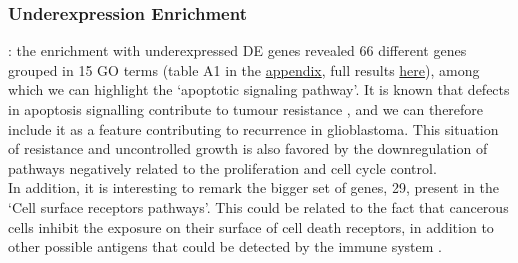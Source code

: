 \documentclass[9pt,twocolumn,twoside]{gsajnl}
\begin{document}
\subsubsection*{Underexpression Enrichment}: the enrichment with underexpressed DE genes revealed 66 different genes grouped in 15 GO terms (table A1 in the \href{http://ieoproject.tk/ieo/supplementary/appendix.pdf}{appendix}, full results \href{http://ieoproject.tk/ieo/supplementary/go_underexpr_results.html}{here}), among which we can highlight the `apoptotic signaling pathway'. It is known that defects in apoptosis signalling contribute to tumour resistance \citep{Debatin2004}, and we can therefore include it as a feature contributing to recurrence in glioblastoma. This situation of resistance and uncontrolled growth is also favored by the downregulation of pathways negatively related to the proliferation and cell cycle control.\\
In addition, it is interesting to remark the bigger set of genes, 29, present in the `Cell surface receptors pathways'. This could be related to the fact that cancerous cells inhibit the exposure on their surface of cell death receptors, in addition to other possible antigens that could be detected by the immune system \citep{Ozoren2003}.
\end{document}

